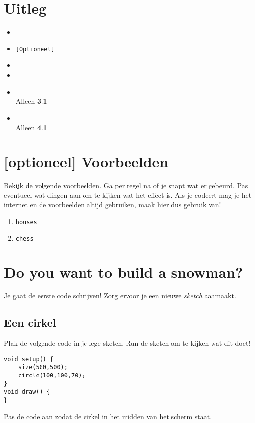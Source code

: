 \section{Uitleg}
\begin{itemize}
	\item{}
	\item\texttt{[Optioneel] }
	\item{}
	\item{}
	\item{}\\
	Alleen \textbf{3.1}
	\item{}\\
	Alleen \textbf{4.1}
\end{itemize}


\section{[optioneel] Voorbeelden}
Bekijk de volgende voorbeelden. Ga per regel na of je snapt wat er gebeurd. Pas eventueel wat dingen aan om te kijken wat het effect is. Als je codeert mag je het internet en de voorbeelden altijd gebruiken, maak hier dus gebruik van!
\begin{enumerate}
	\item \texttt{houses}
	\item \texttt{chess}
\end{enumerate}

\section{Do you want to build a snowman?}
Je gaat de eerste code schrijven! Zorg ervoor je een nieuwe \textit{sketch} aanmaakt.
\subsection{Een cirkel}
Plak de volgende code in je lege sketch. Run de sketch om te kijken wat dit doet!
\begin{lstlisting}
void setup() {
    size(500,500);
    circle(100,100,70);
}
void draw() {
}
\end{lstlisting}
Pas de code aan zodat de cirkel in het midden van het scherm staat.
